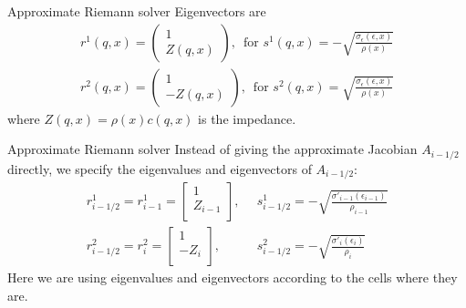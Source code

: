 \documentclass{beamer}
\begin{document}
\begin{frame}{Approximate Riemann solver}
Eigenvectors are
\begin{align*}
r^1(q,x)=\left(
                     \begin{array}{c}
                       1 \\
                       Z(q,x)
                     \end{array}
                   \right)  ,\,\,\, \mbox{for } s^1(q,x)=-\sqrt{\frac{\sigma_{\epsilon}(\epsilon,x)}{\rho(x)}}
\end{align*}
\begin{align*}
r^2(q,x)=\left(
                     \begin{array}{c}
                       1 \\
                       -Z(q,x)
                     \end{array}
                   \right)  ,\,\,\, \mbox{for } s^2(q,x)=\sqrt{\frac{\sigma_{\epsilon}(\epsilon,x)}{\rho(x)}}
\end{align*}
where $Z(q,x)=\rho(x)c(q,x)$ is the impedance.
\end{frame}

\begin{frame}{Approximate Riemann solver}
Instead of giving the approximate Jacobian $A_{i-1/2}$ directly, we specify the eigenvalues and eigenvectors of $A_{i-1/2}$:
\begin{align}
r^1_{i-1/2}=r^1_{i-1}=\left[
                        \begin{array}{c}
                          1 \\ Z_{i-1} \\
                        \end{array}
                      \right], & \,\,\, s^1_{i-1/2}=-\sqrt{\frac{\sigma'_{i-1}(\epsilon_{i-1})}{\rho_{i-1}}}\\
r^2_{i-1/2}=r^2_{i}=\left[
                        \begin{array}{c}
                          1 \\ -Z_{i} \\
                        \end{array}
                      \right], &\,\,\, s^2_{i-1/2}=-\sqrt{\frac{\sigma'_{i}(\epsilon_{i})}{\rho_{i}}}
\end{align}
Here we are using eigenvalues and eigenvectors according to the cells where they are.
\end{frame}
\end{document}
